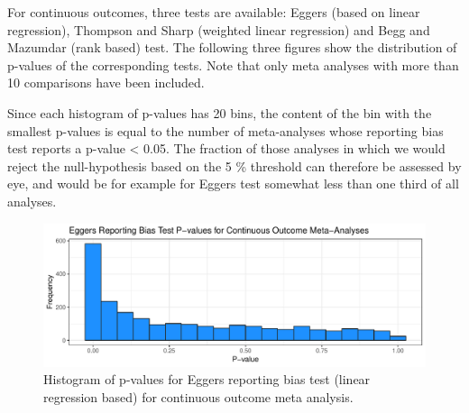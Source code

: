 \documentclass[11pt,a4paper,twoside]{book}\usepackage[]{graphicx}\usepackage[]{color}
\newenvironment{knitrout}{}{} %
\begin{document}
\vspace{0mm}
For continuous outcomes, three tests are available: Eggers (based on linear regression), Thompson and Sharp (weighted linear regression) and Begg and Mazumdar (rank based) test. The following three figures show the distribution of p-values of the corresponding tests. Note that only meta analyses with more than 10 comparisons have been included. 

\vspace{0mm}
Since each histogram of p-values has 20 bins, the content of the bin with the smallest p-values is equal to the number of meta-analyses whose reporting bias test reports a p-value < 0.05. The fraction of those analyses in which we would reject the null-hypothesis based on the 5 \% threshold can therefore be assessed by eye, and would be for example for Eggers test somewhat less than one third of all analyses. 

\begin{figure}
\begin{knitrout}
\color{fgcolor}

{\centering \includegraphics[width=\textwidth-3cm]{figure/ch02_figunnamed-chunk-17-1} 

}



\end{knitrout}
\caption{Histogram of p-values for Eggers reporting bias test (linear regression based) for continuous outcome meta analysis.}
\label{egger.cont}
\end{figure}
\end{document}
